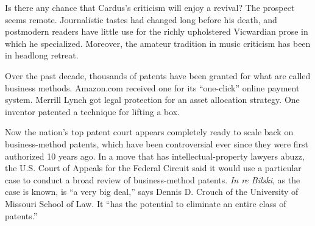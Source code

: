 \documentclass[12pt,a4paper]{article}
\begin{document}
\begin{reading}
\begin{examtext}
Is there any chance that Cardus's criticism will enjoy a revival? The prospect seems remote. Journalistic tastes had changed long before his death, and postmodern readers have little use for the richly upholstered Vicwardian prose in which he specialized. Moreover, the amateur tradition in music criticism has been in headlong retreat.
\end{examtext}






\begin{examtext}
Over the past decade, thousands of patents have been granted for what are called business methods. Amazon.com received one for its ``one-click'' online payment system. Merrill Lynch got legal protection for an asset allocation strategy. One inventor patented a technique for lifting a box.

Now the nation's top patent court appears completely ready to scale back on business-method patents, which have been controversial ever since they were first authorized 10 years ago. In a move that has intellectual-property lawyers abuzz, the U.S. Court of Appeals for the Federal Circuit said it would use a particular case to conduct a broad review of business-method patents. \textit{In re Bilski}, as the case is known, is ``a very big deal,'' says Dennis D. Crouch of the University of Missouri School of Law. It ``has the potential to eliminate an entire class of patents.''


\end{examtext}
\end{reading}
\end{document}
